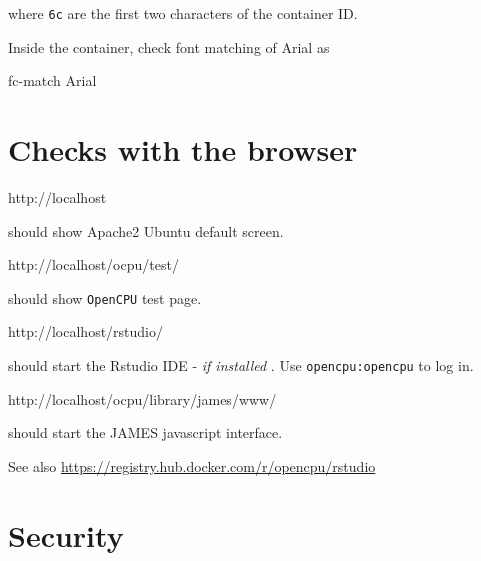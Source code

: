 \documentclass[
]{book}
\newenvironment{Shaded}{\begin{snugshade}}{\end{snugshade}}
\newcommand{\ExtensionTok}[1]{#1}
\newcommand{\NormalTok}[1]{#1}
\begin{document}
where \texttt{6c} are the first two characters of the container ID.

Inside the container, check font matching of Arial as

\begin{Shaded}
\begin{Highlighting}[]
\ExtensionTok{fc{-}match}\NormalTok{ Arial}
\end{Highlighting}
\end{Shaded}

\hypertarget{checks-with-the-browser}{%
\section{Checks with the browser}\label{checks-with-the-browser}}

\begin{Shaded}
\begin{Highlighting}[]
\ExtensionTok{http://localhost}
\end{Highlighting}
\end{Shaded}

should show Apache2 Ubuntu default screen.

\begin{Shaded}
\begin{Highlighting}[]
\ExtensionTok{http://localhost/ocpu/test/}
\end{Highlighting}
\end{Shaded}

should show \texttt{OpenCPU} test page.

\begin{Shaded}
\begin{Highlighting}[]
\ExtensionTok{http://localhost/rstudio/}
\end{Highlighting}
\end{Shaded}

should start the Rstudio IDE - \emph{if installed} . Use \texttt{opencpu:opencpu} to log in.

\begin{Shaded}
\begin{Highlighting}[]
\ExtensionTok{http://localhost/ocpu/library/james/www/}
\end{Highlighting}
\end{Shaded}

should start the JAMES javascript interface.

See also \url{https://registry.hub.docker.com/r/opencpu/rstudio}

\hypertarget{security}{%
\section{Security}\label{security}}
\end{document}
